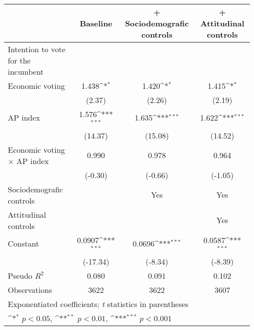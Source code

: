 {
\def\sym#1{\ifmmode^{#1}\else\(^{#1}\)\fi}
\begin{tabular}{l*{3}{c}}
\toprule
                & Baseline         &+ Sociodemografic controls         &+ Attitudinal controls         \\
\midrule
Intention to vote for the incumbent&                  &                  &                  \\
Economic voting &    1.438\sym{*}  &    1.420\sym{*}  &    1.415\sym{*}  \\
                &   (2.37)         &   (2.26)         &   (2.19)         \\
AP index        &    1.576\sym{***}&    1.635\sym{***}&    1.622\sym{***}\\
                &  (14.37)         &  (15.08)         &  (14.52)         \\
Economic voting $\times$ AP index&    0.990         &    0.978         &    0.964         \\
                &  (-0.30)         &  (-0.66)         &  (-1.05)         \\
Sociodemografic controls&                  &      Yes         &      Yes         \\
Attitudinal controls&                  &                  &      Yes         \\
Constant        &   0.0907\sym{***}&   0.0696\sym{***}&   0.0587\sym{***}\\
                & (-17.34)         &  (-8.34)         &  (-8.39)         \\
\midrule
Pseudo \(R^{2}\)&    0.080         &    0.091         &    0.102         \\
Observations    &     3622         &     3622         &     3607         \\
\bottomrule
\multicolumn{4}{l}{\footnotesize Exponentiated coefficients; \textit{t} statistics in parentheses}\\
\multicolumn{4}{l}{\footnotesize \sym{*} \(p<0.05\), \sym{**} \(p<0.01\), \sym{***} \(p<0.001\)}\\
\end{tabular}
}
